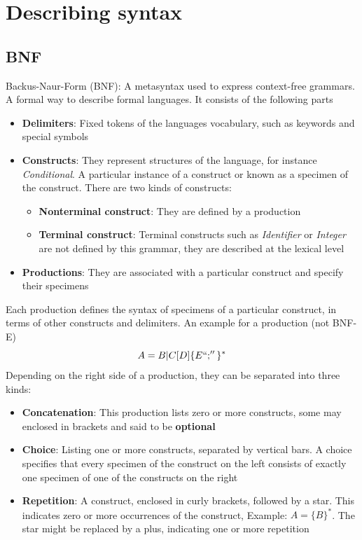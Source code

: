 \documentclass[a4paper]{article}
\begin{document}
\section{Describing syntax}
\subsection{BNF}
Backus-Naur-Form (BNF): A metasyntax used to express context-free grammars. A formal way to describe formal languages. It consists of the following parts
\begin{itemize}
\item \textbf{Delimiters}: Fixed tokens of the languages vocabulary, such as keywords and special symbols
\item \textbf{Constructs}: They represent structures of the language, for instance \emph{Conditional}. A particular instance of a construct or known as a specimen of the construct. There are two kinds of constructs:
\begin{itemize}
\item \textbf{Nonterminal construct}: They are defined by a production
\item \textbf{Terminal construct}: Terminal constructs such as \emph{Identifier} or \emph{Integer} are not defined by this grammar, they are described at the lexical level
\end{itemize}
\item \textbf{Productions}: They are associated with a particular construct and specify their specimens
\end{itemize}
Each production defines the syntax of specimens of a particular construct, in terms of other constructs and delimiters. An example for a production (not BNF-E) 
\[A=B|C[D]\{ E``;''\}^*\]
Depending on the right side of a production, they can be separated into three kinds:
\begin{itemize}
\item \textbf{Concatenation}: This production lists zero or more constructs, some may enclosed in brackets and said to be \textbf{optional}
\item\textbf{Choice}: Listing one or more constructs, separated by vertical bars. A choice specifies that every specimen of the construct on the left consists of exactly one specimen of one of the constructs on the right
\item \textbf{Repetition}: A construct, enclosed in curly brackets, followed by a star. This indicates zero or more occurrences of the construct, Example: $A=\{ B\}^*$. The star might be replaced by a plus, indicating one or more repetition
\end{itemize}
\end{document}
